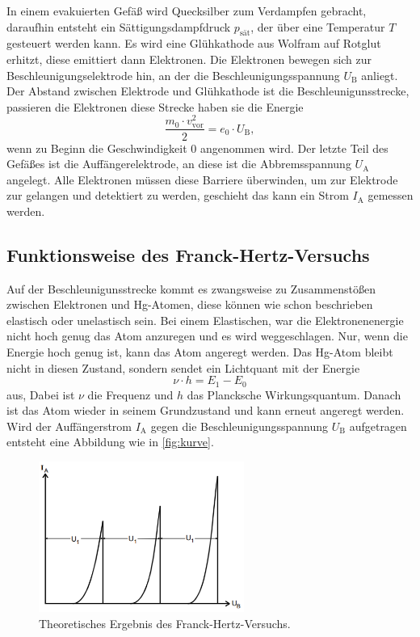 In einem evakuierten Gefäß wird Quecksilber zum Verdampfen gebracht, daraufhin entsteht ein Sättigungsdampfdruck $p_\text{sät}$, der über eine Temperatur $T$ gesteuert werden kann.
Es wird eine Glühkathode aus Wolfram auf Rotglut erhitzt, diese emittiert dann Elektronen.
Die Elektronen bewegen sich zur Beschleunigungselektrode hin, an der die Beschleunigungsspannung $U_\text{B}$ anliegt. 
Der Abstand zwischen Elektrode und Glühkathode ist die Beschleunigunsstrecke, passieren die Elektronen diese Strecke haben sie die Energie
\begin{equation}
    \frac{m_0 \cdot v^2_\text{vor}}{2} = e_0 \cdot U_\text{B},
    \label{eq:beschleu}
\end{equation}
wenn zu Beginn die Geschwindigkeit 0 angenommen wird.
Der letzte Teil des Gefäßes ist die Auffängerelektrode, an diese ist die Abbremsspannung $U_\text{A}$ angelegt.
Alle Elektronen müssen diese Barriere überwinden, um zur Elektrode zur gelangen und detektiert zu werden, geschieht das kann ein Strom $I_\text{A}$ gemessen werden.

\subsection{Funktionsweise des Franck-Hertz-Versuchs}
\label{ssec:funktion}

Auf der Beschleunigunsstrecke kommt es zwangsweise zu Zusammenstößen zwischen Elektronen und Hg-Atomen, diese können wie schon beschrieben elastisch oder unelastisch sein.
Bei einem Elastischen, war die Elektronenenergie nicht hoch genug das Atom anzuregen und es wird weggeschlagen.
Nur, wenn die Energie hoch genug ist, kann das Atom angeregt werden.
Das Hg-Atom bleibt nicht in diesen Zustand, sondern sendet ein Lichtquant mit der Energie
\begin{equation}
    \nu \cdot h = E_1 - E_0
    \label{eq:quant}
\end{equation}
aus, Dabei ist $\nu$ die Frequenz und $h$ das Plancksche Wirkungsquantum.
Danach ist das Atom wieder in seinem Grundzustand und kann erneut angeregt werden.
Wird der Auffängerstrom $I_\text{A}$ gegen die Beschleunigungsspannung $U_\text{B}$ aufgetragen entsteht eine Abbildung wie in \autoref{fig:kurve}.

\begin{figure}
    \centering
    \includegraphics[width=0.6\textwidth]{images/bild2.png}
    \caption{Theoretisches Ergebnis des Franck-Hertz-Versuchs.\cite{V601}}
    \label{fig:kurve}
\end{figure}

